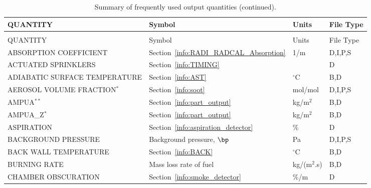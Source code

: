 \documentclass[11pt]{book}
\begin{document}
\begin{longtable}{@{\extracolsep{\fill}}|l|l|l|l|}
\caption[Frequently used output quantities]{Summary of frequently used output quantities.}
\label{tab:output} \\
\hline
{\ct QUANTITY}                           & Symbol                                        & Units          & File Type    \\
\hline \hline
\endfirsthead
\caption[]{Summary of frequently used output quantities (continued).} \\
\hline
{\ct QUANTITY}                           & Symbol                                        & Units          & File Type    \\
\hline \hline
\endhead
{\ct ABSORPTION COEFFICIENT}                    & Section~\ref{info:RADI_RADCAL_Absorption}     & 1/m            & D,I,P,S      \\ \hline
{\ct ACTUATED SPRINKLERS}                       & Section~\ref{info:TIMING}                     &                & D            \\ \hline
{\ct ADIABATIC SURFACE TEMPERATURE}             & Section~\ref{info:AST}                        & $^\circ$C      & B,D          \\ \hline
{\ct AEROSOL VOLUME FRACTION}$^*$               & Section~\ref{info:soot}                       & mol/mol        & D,I,P,S      \\ \hline
{\ct AMPUA}$^{**}$                              & Section~\ref{info:part_output}                & kg/m$^2$       & B,D          \\ \hline
{\ct AMPUA\_Z}$^{*}$                            & Section~\ref{info:part_output}                & kg/m$^2$       & B,D          \\ \hline
{\ct ASPIRATION}                                & Section~\ref{info:aspiration_detector}        & \%             & D            \\ \hline
{\ct BACKGROUND PRESSURE}                       & Background pressure, $\bp$                    & Pa             & D,I,P,S      \\ \hline
{\ct BACK WALL TEMPERATURE}                     & Section~\ref{info:BACK}                       & $^\circ$C      & B,D          \\ \hline
{\ct BURNING RATE}                              & Mass loss rate of fuel                        & \si{kg/(m$^2$.s)} & B,D       \\ \hline
{\ct CHAMBER OBSCURATION}                       & Section~\ref{info:smoke_detector}             & \%/m           & D            \\ \hline

\end{longtable}
\end{document}
